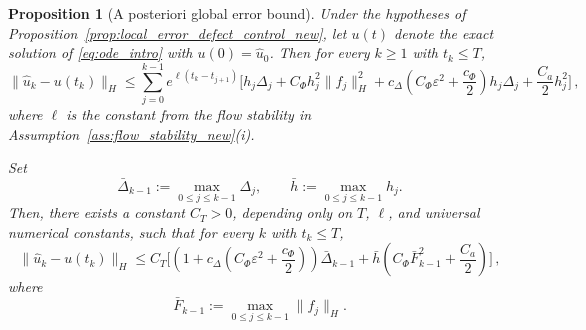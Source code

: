 \documentclass[oneside,11pt]{article}
\newtheorem{proposition}{Proposition}
\theoremstyle{remark}
\theoremstyle{thmstyleone}
\theoremstyle{thmstylethree}
\theoremstyle{thmstyletwo}
\newcommand{\norm}[1]{\lVert #1\rVert}
\newcommand{\tc}[1]{#1}
\begin{document}
\begin{proposition}[A posteriori global error bound]
  \label{thm:global_error_new}
  Under the hypotheses of  Proposition~\ref{prop:local_error_defect_control_new}, let $u(t)$ denote the exact solution of \eqref{eq:ode_intro} with $u(0)=\hat u_0$.
  Then for every $k \geq 1$ with $t_k \leq T$,
  \begin{equation}
    \norm{\hat u_k-u(t_k)}_H
    \le
    \sum_{j=0}^{k-1}
    e^{\ell(t_k-t_{j+1})}
    \Biggl[
    h_j\Delta_j
    +
    C_\Phi h_j^2\norm{f_j}_H^2
    +
    \tc{
    c_\Delta
    \left(
    C_\Phi\varepsilon^2+\frac{c_\Phi}{2}
    \right)h_j\Delta_j}
    +
    \frac{C_a}{2}h_j^2
    \Biggr]\,,
    \label{eq:global_error_new}
  \end{equation}
  where $\ell$ is the constant from the flow stability in Assumption~\ref{ass:flow_stability_new}(i).
  \tc{
  Set
  \begin{equation*}
    \bar\Delta_{k-1}:=\max_{0\le j\le k-1}\Delta_j,
    \qquad
    \bar h:=\max_{0\le j\le k-1}h_j.
  \end{equation*}}
  Then, there exists a constant $C_T>0$, depending only on $T$, $\ell$, and universal numerical constants, such that for every $k$ with $t_k\le T$,
  \begin{equation}
    \norm{\hat u_k-u(t_k)}_H
    \le
    C_T
    \Biggl[
    \tc{
        \left(
        1
        +
        c_\Delta
        \left(
          C_\Phi\varepsilon^2+\frac{c_\Phi}{2}
          \right)
        \right)
        \bar\Delta_{k-1}}
    +
    \tc{
    \bar h
    \left(
    C_\Phi\bar F_{k-1}^2
    +
    \frac{C_a}{2}
    \right)}
    \Biggr]\,,
    \label{eq:global_bigO_new}
  \end{equation}
  where
  \begin{equation}
    \bar F_{k-1}:=\max_{0\le j\le k-1}\norm{f_j}_H.
    \label{eq:bar_F_def_new}
  \end{equation}
\end{proposition}
\end{document}
